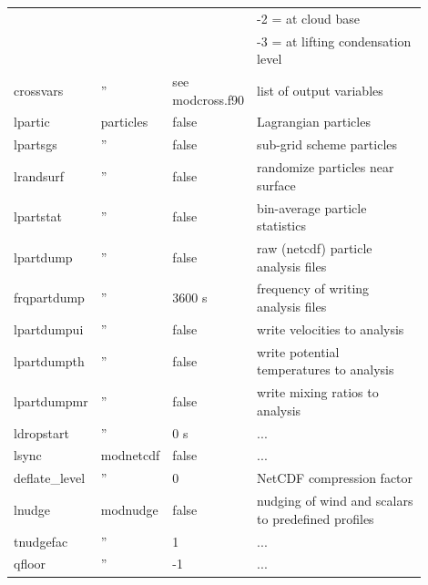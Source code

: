 \documentclass[11pt,a4paper]{article}
\begin{document}
\begin{longtable}[htb]{p{0.12\linewidth}p{0.1\linewidth}p{0.18\linewidth}p{0.5\linewidth}}
             &      &                     & \hspace{2mm} -2 = at cloud base                       \\
             &      &                     & \hspace{2mm} -3 = at lifting condensation level       \\
crossvars    &  ''  & see modcross.f90    & list of output variables                              \\
\hline
lpartic      & particles & false          & Lagrangian particles                                  \\
lpartsgs     &  ''  & false               & sub-grid scheme particles                             \\
lrandsurf    &  ''  & false               & randomize particles near surface                      \\
lpartstat    &  ''  & false               & bin-average particle statistics                       \\
lpartdump    &  ''  & false               & raw (netcdf) particle analysis files                  \\
frqpartdump  &  ''  & 3600 s              & frequency of writing analysis files                   \\                
lpartdumpui  &  ''  & false               & write velocities to analysis                          \\
lpartdumpth  &  ''  & false               & write potential temperatures to analysis              \\
lpartdumpmr  &  ''  & false               & write mixing ratios to analysis                       \\
ldropstart   &  ''  & 0 s                 & ...                                                   \\
\hline
lsync        & modnetcdf & false          & ...                                                   \\
deflate\_level&  ''  & 0                  & NetCDF compression factor                             \\
\hline
lnudge       & modnudge & false           & nudging of wind and scalars to predefined profiles    \\ 
tnudgefac    &  ''  & 1                   & ...                                                   \\
qfloor       &  ''  & -1                  & ...                                                   \\

\end{longtable}
\end{document}
